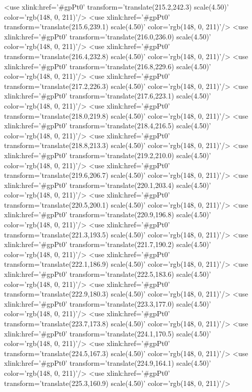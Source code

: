 	<use xlink:href='#gpPt0' transform='translate(215.2,242.3) scale(4.50)' color='rgb(148,   0, 211)'/>
	<use xlink:href='#gpPt0' transform='translate(215.6,239.1) scale(4.50)' color='rgb(148,   0, 211)'/>
	<use xlink:href='#gpPt0' transform='translate(216.0,236.0) scale(4.50)' color='rgb(148,   0, 211)'/>
	<use xlink:href='#gpPt0' transform='translate(216.4,232.8) scale(4.50)' color='rgb(148,   0, 211)'/>
	<use xlink:href='#gpPt0' transform='translate(216.8,229.6) scale(4.50)' color='rgb(148,   0, 211)'/>
	<use xlink:href='#gpPt0' transform='translate(217.2,226.3) scale(4.50)' color='rgb(148,   0, 211)'/>
	<use xlink:href='#gpPt0' transform='translate(217.6,223.1) scale(4.50)' color='rgb(148,   0, 211)'/>
	<use xlink:href='#gpPt0' transform='translate(218.0,219.8) scale(4.50)' color='rgb(148,   0, 211)'/>
	<use xlink:href='#gpPt0' transform='translate(218.4,216.5) scale(4.50)' color='rgb(148,   0, 211)'/>
	<use xlink:href='#gpPt0' transform='translate(218.8,213.3) scale(4.50)' color='rgb(148,   0, 211)'/>
	<use xlink:href='#gpPt0' transform='translate(219.2,210.0) scale(4.50)' color='rgb(148,   0, 211)'/>
	<use xlink:href='#gpPt0' transform='translate(219.6,206.7) scale(4.50)' color='rgb(148,   0, 211)'/>
	<use xlink:href='#gpPt0' transform='translate(220.1,203.4) scale(4.50)' color='rgb(148,   0, 211)'/>
	<use xlink:href='#gpPt0' transform='translate(220.5,200.1) scale(4.50)' color='rgb(148,   0, 211)'/>
	<use xlink:href='#gpPt0' transform='translate(220.9,196.8) scale(4.50)' color='rgb(148,   0, 211)'/>
	<use xlink:href='#gpPt0' transform='translate(221.3,193.5) scale(4.50)' color='rgb(148,   0, 211)'/>
	<use xlink:href='#gpPt0' transform='translate(221.7,190.2) scale(4.50)' color='rgb(148,   0, 211)'/>
	<use xlink:href='#gpPt0' transform='translate(222.1,186.9) scale(4.50)' color='rgb(148,   0, 211)'/>
	<use xlink:href='#gpPt0' transform='translate(222.5,183.6) scale(4.50)' color='rgb(148,   0, 211)'/>
	<use xlink:href='#gpPt0' transform='translate(222.9,180.3) scale(4.50)' color='rgb(148,   0, 211)'/>
	<use xlink:href='#gpPt0' transform='translate(223.3,177.0) scale(4.50)' color='rgb(148,   0, 211)'/>
	<use xlink:href='#gpPt0' transform='translate(223.7,173.8) scale(4.50)' color='rgb(148,   0, 211)'/>
	<use xlink:href='#gpPt0' transform='translate(224.1,170.5) scale(4.50)' color='rgb(148,   0, 211)'/>
	<use xlink:href='#gpPt0' transform='translate(224.5,167.3) scale(4.50)' color='rgb(148,   0, 211)'/>
	<use xlink:href='#gpPt0' transform='translate(224.9,164.1) scale(4.50)' color='rgb(148,   0, 211)'/>
	<use xlink:href='#gpPt0' transform='translate(225.3,160.9) scale(4.50)' color='rgb(148,   0, 211)'/>

